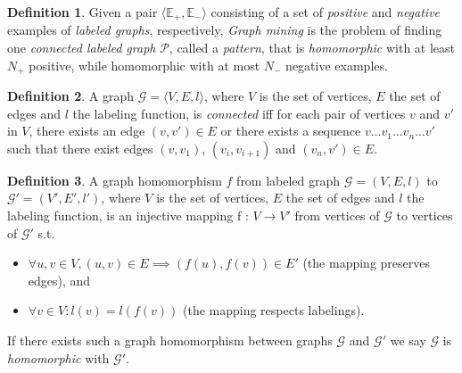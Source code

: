 \documentclass{article}
\theoremstyle{definition}
\newtheorem{definition}{Definition}[section]
\newcommand{\triple}[1]{\ensuremath{\langle #1 \rangle}}
\newcommand{\pair}[1]{\ensuremath{\left(#1\right)}}
\newcommand{\graph}[1]{\ensuremath{\mathcal{#1}}}
\newcommand{\graphset}[1]{\ensuremath{\mathbb{#1}}}
\begin{document}
\begin{definition}
\label{def:GM1}
Given a pair $\triple{\graphset{E}_{+},\graphset{E}_{-}}$ consisting of a set of \emph{positive} and \emph{negative} examples of \emph{labeled graphs}, respectively,
\emph{Graph mining} is the problem of finding one \emph{connected labeled graph} $\graph{P}$, called a \emph{pattern},
that is \emph{homomorphic} with at least $N_{+}$ positive, while homomorphic with at most $N_{-}$ negative examples.
\end{definition}

\begin{definition}
A graph $\graph{G} = \triple{V,E,l}$, where $V$ is the set of vertices, $E$ the set of edges and $l$ the labeling function, is \emph{connected} iff for each pair of vertices $v$ and $v'$ in $V$, there exists an edge $\pair{v,v'} \in E$ or there exists a sequence $v \ldots v_{1} \ldots v_{n} \ldots v'$ such that there exist edges $\pair{v,v_{1}}$, $\pair{v_{i},v_{i+1}}$ and $\pair{v_{n},v'} \in E$.
\end{definition}


\begin{definition}
A graph homomorphism $f$ from labeled graph $\graph{G} = (V,E,l)$ to $\graph{G}' = (V',E',l')$, where $V$ is the set of vertices, $E$ the set of edges and $l$ the labeling function, is an injective mapping f : $V \rightarrow V'$ from vertices of $\graph{G}$ to vertices of $\graph{G'}$ s.t. 
\begin{itemize}
\item $\forall u,v \in V, \pair{u,v} \in E \implies \pair{f(u),f(v)} \in E'$ (the mapping preserves edges), and 
\item $\forall v \in V : l(v) = l(f(v))$ (the mapping respects labelings).
\end{itemize}
If there exists such a graph homomorphism between graphs $\graph{G}$ and $\graph{G'}$ we say $\graph{G}$ is \emph{homomorphic} with $\graph{G'}$.
\end{definition}
\end{document}
